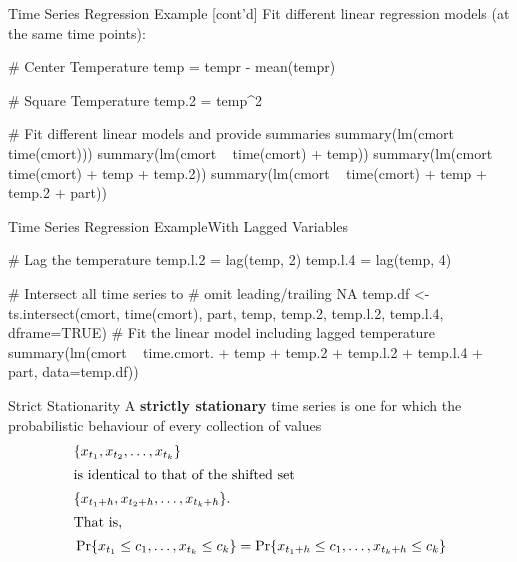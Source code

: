 \documentclass[ignorenonframetext,xcolor=x11names]{beamer}
\begin{document}
\begin{frame}[label=withcode,fragile]{Time Series Regression Example \small [cont'd]}
Fit different linear regression models (at the same time points):
\begin{Rcode}
# Center Temperature
temp = tempr - mean(tempr)

# Square Temperature
temp.2 = temp^2

# Fit different linear models and provide summaries
summary(lm(cmort ~ time(cmort)))
summary(lm(cmort ~ time(cmort) + temp))
summary(lm(cmort ~ time(cmort) + temp + temp.2))
summary(lm(cmort ~ time(cmort) + temp + temp.2 + part))
\end{Rcode}
\end{frame}

\begin{frame}[label=withcode,fragile]{Time Series Regression Example}{With Lagged Variables}

\begin{Rcode}
# Lag the temperature
temp.l.2 = lag(temp, 2)
temp.l.4 = lag(temp, 4)

# Intersect all time series to
# omit leading/trailing NA
temp.df <- ts.intersect(cmort, time(cmort), part, 
                        temp, temp.2, temp.l.2, 
                        temp.l.4,
                        dframe=TRUE)
# Fit the linear model including lagged temperature
summary(lm(cmort ~ time.cmort. + temp + temp.2 + 
                   temp.l.2 + temp.l.4 + part, 
           data=temp.df))
\end{Rcode}
\end{frame}


\begin{frame}[label=full]{Strict Stationarity}
A \textbf{strictly stationary} time series is one for which the probabilistic behaviour of every collection of values
\begin{align*}&\{x_{t_1}, x_{t_2}, \ldots, x_{t_k} \} \\
\intertext{is identical to that of the shifted set}
&\{x_{t_1+h}, x_{t_2+h}, \ldots, x_{t_k + h} \}. \\
\intertext{That is,}
&\Pr \{ x_{t_1} \leq c_1, \ldots, x_{t_k} \leq c_k \} = \Pr \{ x_{t_1+h}\leq c_1, \ldots , x_{t_k+h} \leq c_k \}
\end{align*}
\end{frame}
\end{document}
